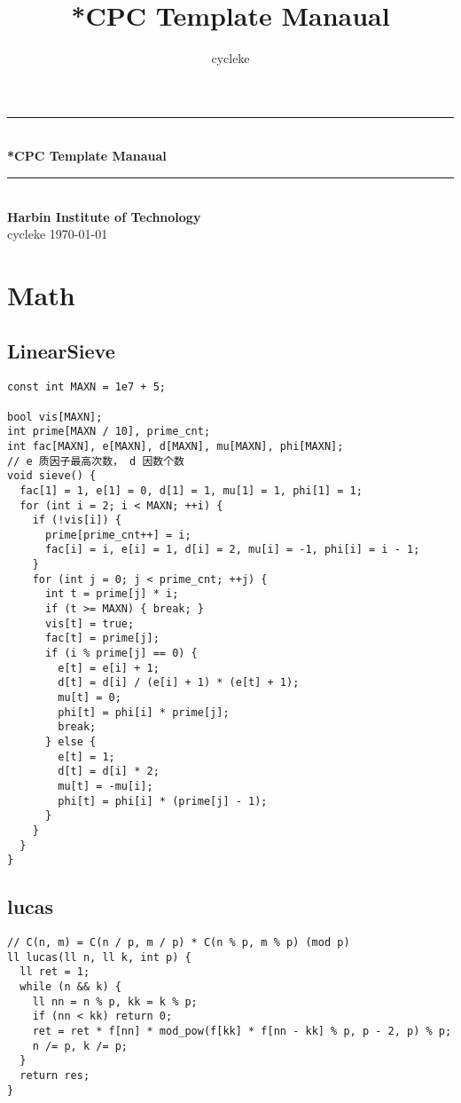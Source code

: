 \documentclass[twoside]{article}
\title{*CPC Template Manaual}
\author{cycleke}
\newcommand{\HRule}{\rule{\linewidth}{0.5mm}}
\begin{document}
\small
\begin{titlepage}
  \begin{center}
    \HRule \\ [1cm]
    \textbf{\Huge{*CPC Template Manaual}} \\ [0.5cm]
    \HRule \\ [4cm]
    \textbf{\Huge{Harbin Institute of Technology}} \\ [1cm]
    \LARGE{cycleke}
    \vfill
    \Large{\today}
  \end{center}
  \clearpage
\end{titlepage}
\tableofcontents\clearpage
\pagestyle{fancy}
\lfoot{}
\cfoot{\thepage}\rfoot{}
\setcounter{section}{0}
\setcounter{page}{1}
\clearpage

\section{Math}

\subsection{LinearSieve}
\begin{lstlisting}
const int MAXN = 1e7 + 5;

bool vis[MAXN];
int prime[MAXN / 10], prime_cnt;
int fac[MAXN], e[MAXN], d[MAXN], mu[MAXN], phi[MAXN];
// e 质因子最高次数， d 因数个数
void sieve() {
  fac[1] = 1, e[1] = 0, d[1] = 1, mu[1] = 1, phi[1] = 1;
  for (int i = 2; i < MAXN; ++i) {
    if (!vis[i]) {
      prime[prime_cnt++] = i;
      fac[i] = i, e[i] = 1, d[i] = 2, mu[i] = -1, phi[i] = i - 1;
    }
    for (int j = 0; j < prime_cnt; ++j) {
      int t = prime[j] * i;
      if (t >= MAXN) { break; }
      vis[t] = true;
      fac[t] = prime[j];
      if (i % prime[j] == 0) {
        e[t] = e[i] + 1;
        d[t] = d[i] / (e[i] + 1) * (e[t] + 1);
        mu[t] = 0;
        phi[t] = phi[i] * prime[j];
        break;
      } else {
        e[t] = 1;
        d[t] = d[i] * 2;
        mu[t] = -mu[i];
        phi[t] = phi[i] * (prime[j] - 1);
      }
    }
  }
}

\end{lstlisting}
\subsection{lucas}
\begin{lstlisting}
// C(n, m) = C(n / p, m / p) * C(n % p, m % p) (mod p)
ll lucas(ll n, ll k, int p) {
  ll ret = 1;
  while (n && k) {
    ll nn = n % p, kk = k % p;
    if (nn < kk) return 0;
    ret = ret * f[nn] * mod_pow(f[kk] * f[nn - kk] % p, p - 2, p) % p;
    n /= p, k /= p;
  }
  return res;
}

\end{lstlisting}
\end{document}
